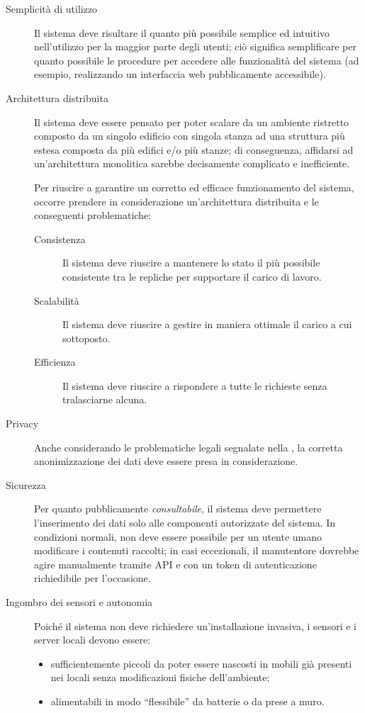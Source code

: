 \begin{description}
  \item[Semplicità di utilizzo]
    Il sistema deve risultare il quanto più possibile semplice ed intuitivo nell'utilizzo per la maggior parte degli utenti;
    ciò significa semplificare per quanto possibile le procedure per accedere alle funzionalità del sistema (ad esempio, realizzando un interfaccia web pubblicamente accessibile).
  \item[Architettura distribuita]
    Il sistema deve essere pensato per poter scalare da un ambiente ristretto composto da un singolo edificio con singola stanza ad una struttura più estesa composta da più edifici e/o più stanze;
    di conseguenza, affidarsi ad un'architettura monolitica sarebbe decisamente complicato e inefficiente.

    Per riuscire a garantire un corretto ed efficace funzionamento del sistema, occorre prendere in considerazione un'architettura distribuita e le conseguenti problematiche:

    \begin{description}
      \item[Consistenza]
        Il sistema deve riuscire a mantenere lo stato il più possibile consistente tra le repliche per supportare il carico di lavoro.
      \item[Scalabilità]
        Il sistema deve riuscire a gestire in maniera ottimale il carico a cui sottoposto.
      \item[Efficienza]
        Il sistema deve riuscire a rispondere a tutte le richieste senza tralasciarne alcuna.
    \end{description}
  \item[Privacy]
    Anche considerando le problematiche legali segnalate nella , la corretta anonimizzazione dei dati deve essere presa in considerazione.
  \item[Sicurezza]
    Per quanto pubblicamente \emph{consultabile}, il sistema deve permettere l'inserimento dei dati solo alle componenti autorizzate del sistema.
    In condizioni normali, non deve essere possibile per un utente umano modificare i contenuti raccolti;
    in casi eccezionali, il manutentore dovrebbe agire manualmente tramite API e con un token di autenticazione richiedibile per l'occasione.
  \item[Ingombro dei sensori e autonomia]
    Poiché il sistema non deve richiedere un'installazione invasiva, i sensori e i server locali devono essere:
    \begin{itemize}
      \item sufficientemente piccoli da poter essere nascosti in mobili già presenti nei locali senza modificazioni fisiche dell'ambiente;
      \item alimentabili in modo ``flessibile'' da batterie o da prese a muro.
    \end{itemize}
\end{description}
